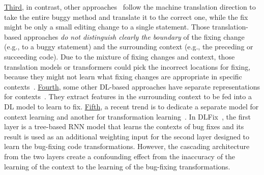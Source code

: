 \underline{Third}, in contrast, other
approaches~\cite{hata2018learning,tufano2019learning,tufano2018empirical}
follow the machine translation direction to take the entire buggy
method and translate it to the correct one, while the fix might be
only a small editing change to a single statement. Those
translation-based approaches {\em do not distinguish clearly the
  boundary} of the fixing change (e.g., to a buggy statement) and the
surrounding context (e.g., the preceding or succeeding code). Due to
the mixture of fixing changes and context, those translation models or
transformers could pick the incorrect locations for fixing, because
they might not learn what fixing changes are appropriate in specific
contexts~\cite{icse20}. \underline{Fourth}, some other DL-based
approaches have separate representations for
contexts~\cite{chen2018sequencer,icse20,cure-icse21,lutellier2020coconut}.
They extract features in the surrounding context to be fed into a DL
model to learn to fix. \underline{Fifth}, a recent trend is to
dedicate a separate model for context learning and another for
transformation learning~\cite{icse20}. In DLFix~\cite{icse20}, the
first layer is a tree-based RNN model that learns the contexts of bug
fixes and its result is used as an additional weighting input for the
second layer designed to learn the bug-fixing code
transformations. However, the cascading architecture from the two
layers create a confounding effect from the inaccuracy of the learning
of the context to the learning of the bug-fixing transformations.



